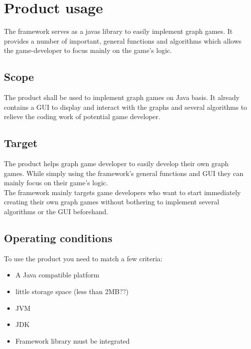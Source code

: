 \section{Product usage}
The \gls{framework} serves as a \glspl{java} \gls{library} to easily implement \gls{graph} games. It provides a number of important, general functions and algorithms which allows the \gls{game-developer} to focus mainly on the game's logic.

\subsection{Scope}
The product shall be used to implement graph games on Java basis. It already contains a \gls{GUI} to display and interact with the graphs and several algorithms to relieve the coding work of potential game developer.

\subsection{Target}
The product helps graph game developer to easily develop their own graph games. While simply using the framework's general functions and \gls{GUI} they can mainly focus on their game's logic. \\
The framework mainly targets game developers who want to start immediately creating their own graph games without bothering to implement several algorithms or the \gls{GUI} beforehand.

\subsection{Operating conditions}
To use the product you need to match a few criteria:
\begin{itemize}
\item A Java compatible platform
\item little storage space (less than 2MB??)
\item \gls{JVM}
\item \gls{JDK}
\item Framework library must be integrated
\end{itemize}